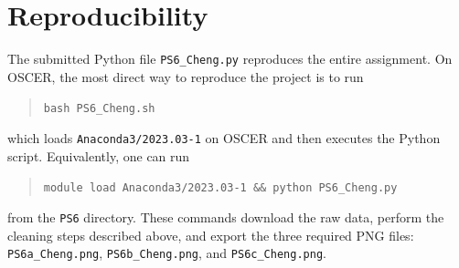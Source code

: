 \documentclass[11pt]{article}
\begin{document}
\section*{Reproducibility}
The submitted Python file \texttt{PS6\_Cheng.py} reproduces the entire assignment.
On OSCER, the most direct way to reproduce the project is to run
\begin{quote}
\texttt{bash PS6\_Cheng.sh}
\end{quote}
which loads \texttt{Anaconda3/2023.03-1} on OSCER and then executes the Python script.
Equivalently, one can run
\begin{quote}
\texttt{module load Anaconda3/2023.03-1 \&\& python PS6\_Cheng.py}
\end{quote}
from the \texttt{PS6} directory.
These commands download the raw data, perform the cleaning steps described above, and export the three required PNG files:
\texttt{PS6a\_Cheng.png}, \texttt{PS6b\_Cheng.png}, and \texttt{PS6c\_Cheng.png}.
\end{document}
